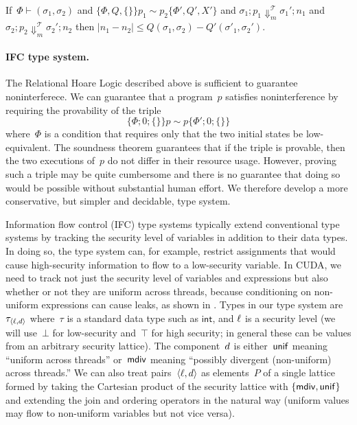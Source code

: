 \begin{theorem}
If~$\Phi \vdash (\sigma_1, \sigma_2)$ and
$\{\Phi, Q, \{\}\} p_1 \sim p_2 \{\Phi', Q', X'\}$
and $\sigma_1; p_1 \Downarrow^{\mathcal{T}}_m \sigma_1'; n_1$
and $\sigma_2; p_2 \Downarrow^{\mathcal{T}}_m \sigma_2'; n_2$
then $|n_1 - n_2| \leq Q(\sigma_1, \sigma_2) - Q'(\sigma'_1, \sigma_2')$.
\end{theorem}


\paragraph{IFC type system.}
The Relational Hoare Logic described above is sufficient to guarantee noninterferece.
%
We can guarantee that a program~$p$ satisfies noninterference by requiring the
provability of the triple
\[\{\Phi; 0; \{\}\} p \sim p \{\Phi'; 0; \{\}\}\]
where~$\Phi$ is a condition that requires only that the two initial states be low-equivalent.
%
The soundness theorem guarantees that if the triple is provable, then the two executions of~$p$ do not differ in their resource usage.
%
However, proving such a triple may be quite cumbersome and there is no guarantee that doing so would be possible without substantial human effort.
%
We therefore develop a more conservative, but simpler and decidable, type system.

Information flow control (IFC) type systems typically extend conventional type systems by tracking the security level of variables in addition to their data types.
%
In doing so, the type system can, for example, restrict assignments that would
cause high-security information to flow to a low-security variable.
%
In CUDA, we need to track not just the security level of variables and
expressions but also
whether or not they are uniform across threads, because conditioning on
non-uniform expressions can cause leaks, as shown in .
%
Types in our type system are~$\tau_{\langle \ell, d \rangle}$
where~$\tau$ is a standard data type such as $\mathsf{int}$, and
$\ell$ is a security level (we will use~$\bot$ for low-security and~$\top$
for high security; in general these can be values from an arbitrary security
lattice).
%
The component~$d$ is either~$\mathsf{unif}$ meaning ``uniform across
threads'' or~$\mathsf{mdiv}$ meaning ``possibly divergent (non-uniform) across threads.''
%
We can also treat pairs~$\langle \ell, d \rangle$ as elements~$P$ of a
single lattice formed by taking the Cartesian product of the security
lattice with $\{\mathsf{mdiv}, \mathsf{unif}\}$ and extending the join and ordering operators
in the natural way (uniform values may flow to non-uniform variables but not
vice versa).


